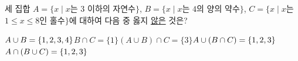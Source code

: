 세 집합 $A=\{x \mid x$는 $3$ 이하의 자연수$\}$, $B=\{x \mid x$는 $4$의 양의 약수$\}$, $C=\{x \mid x$는 $1\le x\le 8$인 홀수$\}$에 대하여 다음 중 옳지 \underline{않은} 것은?
\begin{choicesii}{$A\cup B=\{1{,}\mkern3mu\mathopen{}2{,}\mkern3mu\mathopen{}3{,}\mkern3mu\mathopen{}4\}$}{$B\cap C=\{1\}$}{$(A\cup B)\cap C=\{3\}$}{$A\cup(B\cap C)=\{1{,}\mkern3mu\mathopen{}2{,}\mkern3mu\mathopen{}3\}$}{$A\cap(B\cup C)=\{1{,}\mkern3mu\mathopen{}2{,}\mkern3mu\mathopen{}3\}$}\end{choicesii}
